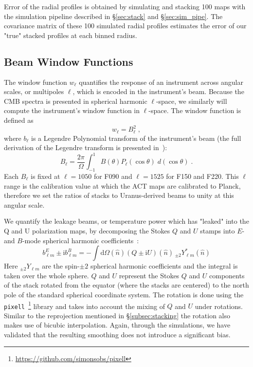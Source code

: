 Error of the radial profiles is obtained by simulating and stacking 100 maps with the simulation pipeline described in \S\ref{sec:stack} and \S\ref{sec:sim_pipe}.  The covariance matrix of these 100 simulated radial profiles estimates the error of our "true" stacked profiles at each binned radius.

\subsection{Beam Window Functions}
\label{subsec:window}
The window function $w_{\ell}$ quantifies the response of an instrument across angular scales, or multipoles $\ell$, which is encoded in the instrument's beam.  Because the CMB spectra is presented in spherical harmonic $\ell$-space, we similarly will compute the instrument's window function in $\ell$-space.  The window function is defined as
\begin{equation}
    w_\ell = B_\ell^2 \; ,
\end{equation}
where $b_\ell$ is a Legendre Polynomial transform of the instrument's beam (the full derivation of the Legendre transform is presented in~\cite{Lungu_2022}): 
\begin{equation}
B_{\ell} = \frac{2\pi}{\Omega}\int_{-1}^{1} B(\theta)P_{\ell}(\cos\theta)\; d(\cos\theta) \; .
\label{eq:legendre}
\end{equation}
Each $B_\ell$ is fixed at $\ell=1050$ for F090 and $\ell=1525$ for F150 and F220.  This $\ell$ range is the calibration value at which the ACT maps are calibrated to Planck, therefore we set the ratios of stacks to Uranus-derived beams to unity at this angular scale.

We quantify the leakage beams, or temperature power which has "leaked" into the Q and U polarization maps, by decomposing the Stokes $Q$ and $U$ stamps into $E$- and $B$-mode spherical harmonic coefficients~\cite{challinor_2000}:
\begin{equation}
\label{eq:pol_beam_coeffs}
b^{E}_{\ell m} \pm \mathrm{i} b^{B}_{\ell m} = - \int \mathrm{d}\Omega(\hat{n}) (Q \pm \mathrm{i} U)(\hat{n})\, {}_{\pm 2}Y^*_{\ell m}(\hat{n})
\end{equation}
Here ${}_{\pm 2}Y_{\ell m}$ are the spin-$\pm2$ spherical harmonic coefficients and the integral is taken over the whole sphere. $Q$ and $U$ represent the Stokes $Q$ and $U$ components of the stack rotated from the equator (where the stacks are centered) to the north pole of the standard spherical coordinate system. The rotation is done using the \texttt{pixell}~\footnote{\url{https://github.com/simonsobs/pixell}} library and takes into account the mixing of $Q$ and $U$ under rotations.  Similar to the reprojection mentioned in \S\ref{subsec:stacking} the rotation also makes use of bicubic interpolation. Again, through the simulations, we have validated that the resulting smoothing does not introduce a significant bias.


